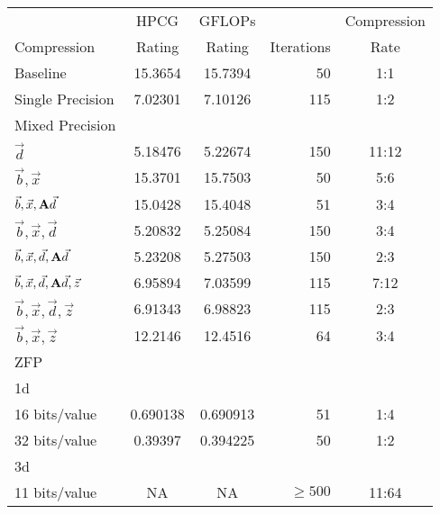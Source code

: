 \begin{table}
	\centering
	\begin{tabular}{l|S[table-format=2.6]|S[table-format=2.6]|r|c}
		            & {HPCG}   & {GFLOPs} &            & Compression \\
		Compression & {Rating} & {Rating} & Iterations & Rate \\
		\hline
		Baseline & 15.3654 & 15.7394 & 50 & 1:1 \\ %
		Single Precision & 7.02301 & 7.10126 & 115 & 1:2 \\
		Mixed Precision & & & & \\ %
		\hspace{3mm} \(\vec{d}\) & 5.18476 & 5.22674 & 150 & 11:12 \\
		\hspace{3mm} \(\vec{b}, \vec{x}\) & 15.3701 & 15.7503 & 50 & 5:6 \\
		\hspace{3mm} \(\vec{b}, \vec{x}, \mathbf{A}\vec{d}\) & 15.0428 & 15.4048 & 51 & 3:4 \\
		\hspace{3mm} \(\vec{b}, \vec{x}, \vec{d}\) & 5.20832 & 5.25084 & 150 & 3:4 \\ %
		\hspace{3mm} \(\vec{b}, \vec{x}, \vec{d}, \mathbf{A}\vec{d}\) & 5.23208 & 5.27503 & 150 & 2:3 \\
		\hspace{3mm} \(\vec{b}, \vec{x}, \vec{d}, \mathbf{A}\vec{d}, \vec{z}\) & 6.95894 & 7.03599 & 115 & 7:12 \\
		\hspace{3mm} \(\vec{b}, \vec{x}, \vec{d}, \vec{z}\) & 6.91343 & 6.98823 & 115 & 2:3 \\
		\hspace{3mm} \(\vec{b}, \vec{x}, \vec{z}\) & 12.2146 & 12.4516 & 64 & 3:4 \\
		ZFP & & & & \\
		\hspace{3mm} 1d & & & & \\
			\hspace{6mm} 16 bits/value & 0.690138 & 0.690913 & 51 & 1:4 \\
			\hspace{6mm} 32 bits/value & 0.39397 & 0.394225 & 50 & 1:2 \\
		\hspace{3mm} 3d & & & & \\
			\hspace{6mm} 11 bits/value & NA & NA & \(\geq 500\) & 11:64 \\

\end{tabular}
\end{table}
